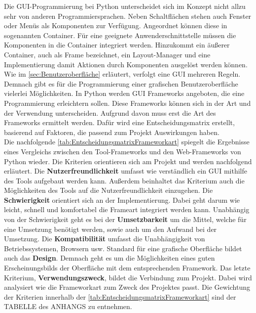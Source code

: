 \documentclass[a4paper,titlepage,halfparskip,12pt]{scrreprt}
\begin{document}
\begin{onehalfspacing}
Die \ac{GUI}-Programmierung bei Python unterscheidet sich im Konzept nicht allzu sehr von anderen Programmiersprachen. Neben Schaltflächen stehen auch Fenster oder Menüs als Komponenten zur Verfügung. Angeordnet können diese in sogenannten Container. Für eine geeignete Anwenderschnittstelle müssen die Komponenten in die Container integriert werden. Hinzukommt ein äußerer Container, auch als Frame bezeichnet, ein Layout-Manager und eine Implementierung damit Aktionen durch Komponenten ausgelöst werden können. Wie im \autoref{sec:Benutzeroberfläche} erläutert, verfolgt eine \ac{GUI} mehreren Regeln. Demnach gibt es für die Programmierung einer grafischen Benutzeroberfläche vielerlei Möglichkeiten. In Python werden \ac{GUI} Frameworks angeboten, die eine Programmierung erleichtern sollen. Diese Frameworks können sich in der Art und der Verwendung unterscheiden. Aufgrund davon muss erst die Art des Frameworks ermittelt werden. Dafür wird eine Entscheidungsmatrix erstellt, basierend auf Faktoren, die passend zum Projekt Auswirkungen haben.\cite{Steyer2018} \\
Die nachfolgende \autoref{tab:EntscheidungsmatrixFrameworkart} spiegelt die Ergebnisse eines Vergleichs zwischen den Tool-Frameworks und den Web-Frameworks von Python wieder. Die Kriterien orientieren sich am Projekt und werden nachfolgend erläutert. Die \textbf{Nutzerfreundlichkeit} umfasst wie verständlich ein GUI mithilfe des Tools aufgebaut werden kann. Außerdem beinhaltet das Kriterium auch die Möglichkeiten des Tools auf die Nutzerfreundlichkeit einzugehen. Die \textbf{Schwierigkeit} orientiert sich an der Implementierung. Dabei geht darum wie leicht, schnell und komfortabel die Frameart integriert werden kann. Unabhängig von der Schwierigkeit geht es bei der \textbf{Umsetzbarkeit} um die Mittel, welche für eine Umsetzung benötigt werden, sowie auch um den Aufwand bei der Umsetzung. Die \textbf{Kompatibilität} umfasst die Unabhängigkeit von Betriebssystemen, Browsern usw. Standard für eine grafische Oberfläche bildet auch das \textbf{Design}. Demnach geht es um die Möglichkeiten eines guten Erscheinungsbilds der Oberfläche mit dem entsprechenden Framework. Das letzte Kriterium, \textbf{Verwendungszweck}, bildet die Verbindung zum Projekt. Dabei wird analysiert wie die Frameworkart zum Zweck des Projektes passt. Die Gewichtung der Kriterien innerhalb der \autoref{tab:EntscheidungsmatrixFrameworkart} sind der TABELLE des ANHANGS zu entnehmen. %
\renewcommand{\arraystretch}{2}
\begin{table}[h]

\end{table}
\end{onehalfspacing}
\end{document}
